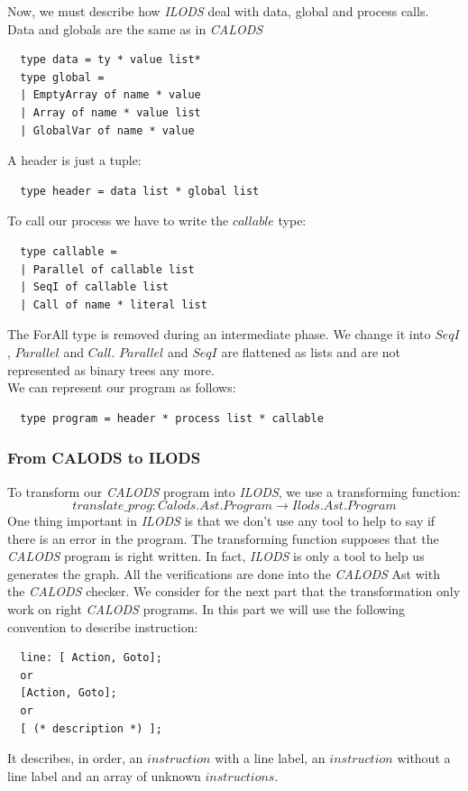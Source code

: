 \documentclass{article}
\begin{document}
Now, we must describe how \textit{ILODS} deal with data, global and process calls. \\ Data and globals are the same as in \textit{CALODS}
\begin{lstlisting}
  type data = ty * value list*
  type global =
  | EmptyArray of name * value
  | Array of name * value list
  | GlobalVar of name * value
\end{lstlisting}
A header is just a tuple: 
\begin{lstlisting}
  type header = data list * global list
\end{lstlisting}
To call our process we have to write the $callable$ type:
\begin{lstlisting}
  type callable = 
  | Parallel of callable list
  | SeqI of callable list
  | Call of name * literal list
\end{lstlisting}
The ForAll type is removed during an intermediate phase. We change it into $SeqI$, $Parallel$ and $Call$. $Parallel$ and $SeqI$ are flattened as lists and are not represented as binary trees any more. \\
We can represent our program as follows: 
\begin{lstlisting}
  type program = header * process list * callable
\end{lstlisting}


\subsubsection{From CALODS to ILODS}
To transform our \textit{CALODS} program into \textit{ILODS}, we use a transforming function:
$$ translate\_prog: Calods.Ast.Program \rightarrow Ilods.Ast.Program $$
One thing important in \textit{ILODS} is that we don't use any tool to help to say if there is an error in the program.
The transforming function supposes that the \textit{CALODS} program is right written. In fact, \textit{ILODS} is only a tool to help us generates the graph. All the verifications are done into the \textit{CALODS} Ast with the \textit{CALODS} checker. We consider for the next part that the transformation only work on right \textit{CALODS} programs. In this part we will use the following convention to describe instruction:
\begin{lstlisting}
  line: [ Action, Goto];
  or
  [Action, Goto];
  or
  [ (* description *) ];
\end{lstlisting}
It describes, in order, an $instruction$ with a line label, an $instruction$ without a line label and an array of unknown $instructions$.
\end{document}
